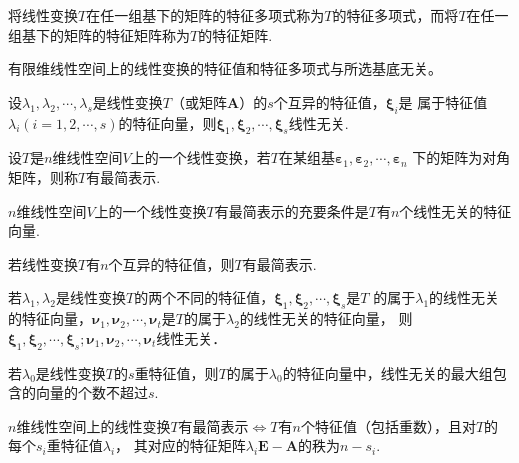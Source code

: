     \begin{definition}
        将线性变换$T$在任一组基下的矩阵的特征多项式称为$T$的{\heiti 特征多项式}，而将$T$在任一组基下的矩阵的特征矩阵称为$T$的{\heiti 特征矩阵}.
    \end{definition}

    \begin{theorem}
        有限维线性空间上的线性变换的特征值和特征多项式与所选基底无关。
    \end{theorem}

    \begin{theorem}
        设$\lambda_1,\lambda_2,\cdots,\lambda_s$是线性变换$T$（或矩阵$\boldsymbol{A}$）的$s$个互异的特征值，$\boldsymbol{\xi}_i$是
        属于特征值$\lambda_i(i=1,2,\cdots,s)$的特征向量，则$\boldsymbol{\xi}_1,\boldsymbol{\xi}_2,\cdots,\boldsymbol{\xi}_s$线性无关.
    \end{theorem}

    \begin{definition}
        设$T$是$n$维线性空间$V$上的一个线性变换，若$T$在某组基$\boldsymbol{\varepsilon}_1,\boldsymbol{\varepsilon}_2,\cdots,\boldsymbol{\varepsilon}_n$
        下的矩阵为对角矩阵，则称$T$有{\heiti 最简表示}.
    \end{definition}

    \begin{theorem}
        $n$维线性空间$V$上的一个线性变换$T$有最简表示的充要条件是$T$有$n$个线性无关的特征向量.
    \end{theorem}

    \begin{theorem}
        若线性变换$T$有$n$个互异的特征值，则$T$有最简表示.
    \end{theorem}

    \begin{theorem}
        若$\lambda_1,\lambda_2$是线性变换$T$的两个不同的特征值，$\boldsymbol{\xi}_1,\boldsymbol{\xi}_2,\cdots,\boldsymbol{\xi}_s$是$T$
        的属于$\lambda_1$的线性无关的特征向量，$\boldsymbol{\nu}_1,\boldsymbol{\nu}_2,\cdots,\boldsymbol{\nu}_t$是$T$的属于$\lambda_2$的线性无关的特征向量，
        则$\boldsymbol{\xi}_1,\boldsymbol{\xi}_2,\cdots,\boldsymbol{\xi}_s;\boldsymbol{\nu}_1,\boldsymbol{\nu}_2,\cdots,\boldsymbol{\nu}_t$线性无关．
    \end{theorem}

    \begin{theorem}
        若$\lambda_0$是线性变换$T$的$s$重特征值，则$T$的属于$\lambda_0$的特征向量中，线性无关的最大组包含的向量的个数不超过$s$.
    \end{theorem}

    \begin{theorem}
        $n$维线性空间上的线性变换$T$有最简表示$\Longleftrightarrow $$T$有$n$个特征值（包括重数），且对$T$的每个$s_i$重特征值$\lambda_i$，
        其对应的特征矩阵$\lambda_i\boldsymbol{E}-\boldsymbol{A}$的秩为$n-s_i$. 
    \end{theorem}